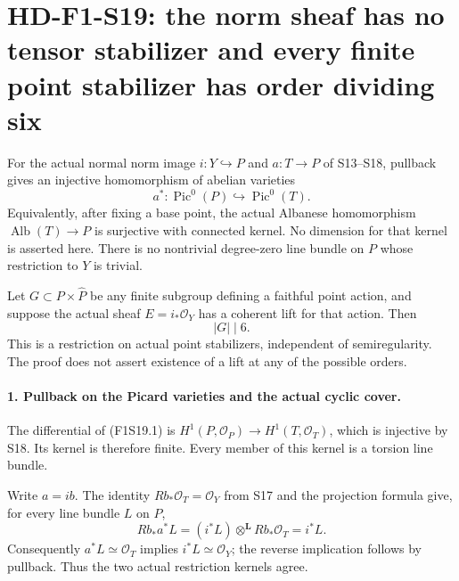 \section[HD-F1-S19: norm-fourfold point stabilizers]{HD-F1-S19: the norm sheaf has no tensor stabilizer and every finite point stabilizer has order dividing six}
\label{sec:f1-norm-fourfold-point-stabilizers}

For the actual normal norm image $i:Y\hookrightarrow P$ and
$a:T\to P$ of S13--S18, pullback gives an injective homomorphism
of abelian varieties
\[
                    a^*:\operatorname{Pic}^0(P)
                              \hookrightarrow\operatorname{Pic}^0(T).
 \tag{F1S19.1}
\]
Equivalently, after fixing a base point, the actual Albanese
homomorphism $\operatorname{Alb}(T)\to P$ is surjective with
connected kernel. No dimension for that kernel is asserted here.
There is no nontrivial degree-zero line bundle on $P$ whose
restriction to $Y$ is trivial.

Let $G\subset P\times\widehat P$ be any finite subgroup defining
a faithful point action, and suppose the actual sheaf
$E=i_*\mathcal O_Y$ has a coherent lift for that action. Then
\[
                              |G|\mid6.
 \tag{F1S19.2}
\]
This is a restriction on actual point stabilizers, independent of
semiregularity. The proof does not assert existence of a lift at
any of the possible orders.

\paragraph{1. Pullback on the Picard varieties and the actual cyclic cover.}
The differential of (F1S19.1) is
$H^1(P,\mathcal O_P)\to H^1(T,\mathcal O_T)$, which is injective
by S18. Its kernel is therefore finite. Every member of this
kernel is a torsion line bundle.

Write $a=ib$. The identity $Rb_*\mathcal O_T=\mathcal O_Y$
from S17 and the projection formula give, for every line bundle
$L$ on $P$,
\[
 Rb_*a^*L=(i^*L)\otimes^{\mathbf L}Rb_*\mathcal O_T=i^*L.
 \tag{F1S19.3}
\]
Consequently $a^*L\simeq\mathcal O_T$ implies
$i^*L\simeq\mathcal O_Y$; the reverse implication follows by
pullback. Thus the two actual restriction kernels agree.

